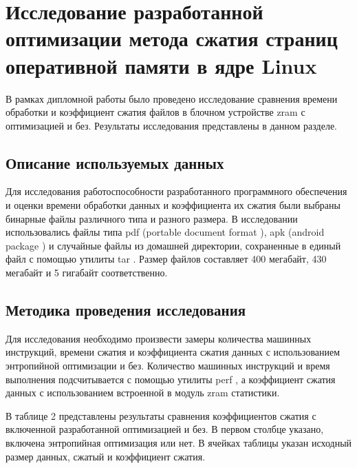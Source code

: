 \section{Исследование разработанной оптимизации метода сжатия страниц оперативной памяти в ядре Linux}

В рамках дипломной работы было проведено исследование сравнения времени обработки и коэффициент сжатия файлов в блочном устройстве zram с оптимизацией и без. Результаты исследования представлены в данном разделе.

\subsection{Описание используемых данных}

Для исследования работоспособности разработанного программного обеспечения и оценки времени обработки данных и коэффициента их сжатия были выбраны бинарные файлы различного типа и разного размера. В исследовании использовались файлы типа pdf (portable document format \cite{pdf}), apk (android package \cite{apk}) и случайные файлы из домашней директории, сохраненные в единый файл с помощью утилиты tar \cite{tar}. Размер файлов составляет 400 мегабайт, 430 мегабайт и 5 гигабайт соответственно.

\subsection{Методика проведения исследования}

Для исследования необходимо произвести замеры количества машинных инструкций, времени сжатия и коэффициента сжатия данных с использованием энтропийной оптимизации и без. Количество машинных инструкций и время выполнения подсчитывается с помощью утилиты perf \cite{perf}, а коэффициент сжатия данных с использованием встроенной в модуль zram статистики.

В таблице 2 представлены результаты сравнения коэффициентов сжатия с включенной разработанной оптимизацией и без. В первом столбце указано, включена энтропийная оптимизация или нет. В ячейках таблицы указан исходный размер данных, сжатый и коэффициент сжатия.

